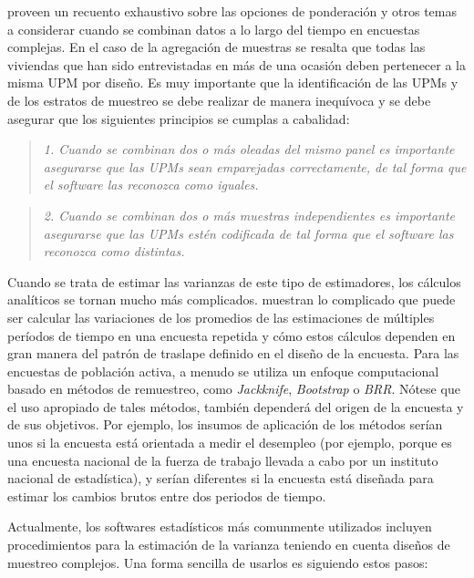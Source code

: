 \citet[capítulos 7 y 8]{Korn_Graubard_1999} proveen un recuento exhaustivo sobre las opciones de ponderación y otros temas a considerar cuando se combinan datos a lo largo del tiempo en encuestas complejas. En el caso de la agregación de muestras se resalta que todas las viviendas que han sido entrevistadas en más de una ocasión deben pertenecer a la misma UPM por diseño. Es muy importante que la identificación de las UPMs y de los estratos de muestreo se debe realizar de manera inequívoca y se debe asegurar que los siguientes principios se cumplas a cabalidad:

\begin{quote}
\emph{1. Cuando se combinan dos o más oleadas del mismo panel es importante asegurarse que las UPMs sean emparejadas correctamente, de tal forma que el software las reconozca como iguales.}
\end{quote}

\begin{quote}
\emph{2. Cuando se combinan dos o más muestras independientes es importante asegurarse que las UPMs estén codificada de tal forma que el software las reconozca como distintas.}
\end{quote}

Cuando se trata de estimar las varianzas de este tipo de estimadores, los cálculos analíticos se tornan mucho más complicados. \citet{Train_Cahoon_Makens_1978} muestran lo complicado que puede ser calcular las variaciones de los promedios de las estimaciones de múltiples períodos de tiempo en una encuesta repetida y cómo estos cálculos dependen en gran manera del patrón de traslape definido en el diseño de la encuesta. Para las encuestas de población activa, a menudo se utiliza un enfoque computacional basado en métodos de remuestreo, como \emph{Jackknife}, \emph{Bootstrap} o \emph{BRR}. Nótese que el uso apropiado de tales métodos, también dependerá del origen de la encuesta y de sus objetivos. Por ejemplo, los insumos de aplicación de los métodos serían unos si la encuesta está orientada a medir el desempleo (por ejemplo, porque es una encuesta nacional de la fuerza de trabajo llevada a cabo por un instituto nacional de estadística), y serían diferentes si la encuesta está diseñada para estimar los cambios brutos entre dos periodos de tiempo.

Actualmente, los softwares estadísticos más comunmente utilizados incluyen procedimientos para la estimación de la varianza teniendo en cuenta diseños de muestreo complejos. Una forma sencilla de usarlos es siguiendo estos pasos:

